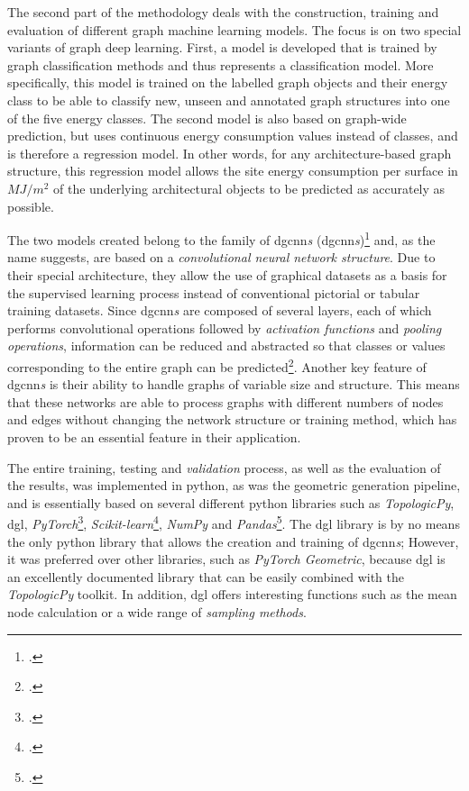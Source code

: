 \documentclass[a4paper, 12pt]{report}
\begin{document}
The second part of the methodology deals with the construction, training and evaluation of different graph machine learning models. The focus is on two special variants of graph deep learning. First, a model is developed that is trained by graph classification methods and thus represents a classification model. More specifically, this model is trained on the labelled graph objects and their energy class to be able to classify new, unseen and annotated graph structures into one of the five energy classes. The second model is also based on graph-wide prediction, but uses continuous energy consumption values instead of classes, and is therefore a regression model. In other words, for any architecture-based graph structure, this regression model allows the \gls{site energy consumption} per surface in $MJ/m^2$ of the underlying architectural objects to be predicted as accurately as possible.

The two models created belong to the family of \acrlong{dgcnn}\textit{s} (\acrshort{dgcnn}\textit{s})\footcite{velivckovic2023everything} and, as the name suggests, are based on a \textit{convolutional neural network structure}. Due to their special architecture, they allow the use of graphical datasets as a basis for the supervised learning process instead of conventional pictorial or tabular training datasets. Since \acrshort{dgcnn}\textit{s} are composed of several layers, each of which performs convolutional operations followed by \textit{\gls{activation} functions} and \textit{\gls{pooling} operations}, information can be reduced and abstracted so that classes or values corresponding to the entire graph can be predicted\footcite{wang2019dgl}. Another key feature of \acrshort{dgcnn}\textit{s} is their ability to handle graphs of variable size and structure. This means that these networks are able to process graphs with different numbers of nodes and edges without changing the network structure or training method, which has proven to be an essential feature in their application.

The entire training, testing and \textit{\gls{validation}} process, as well as the evaluation of the results, was implemented in \Gls{python}, as was the geometric generation pipeline, and is essentially based on several different \Gls{python} libraries such as \textit{TopologicPy}, \acrshort{dgl}, \textit{PyTorch}\footcite{NEURIPS2019_9015}, \textit{Scikit-learn}\footcite{scikit-learn}, \textit{NumPy} and \textit{Pandas}\footcite{mckinney-proc-scipy-2010}. The \acrshort{dgl} library is by no means the only \Gls{python} library that allows the creation and training of \acrshort{dgcnn}\textit{s}; However, it was preferred over other libraries, such as \textit{PyTorch Geometric}, because \acrshort{dgl} is an excellently documented library that can be easily combined with the \textit{TopologicPy} toolkit. In addition, \acrshort{dgl} offers interesting functions such as the mean node calculation or a wide range of \textit{\gls{sampling} methods}.
\end{document}
